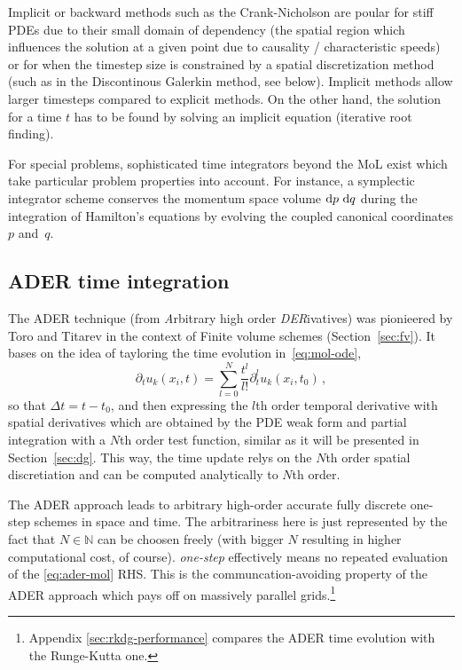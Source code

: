 Implicit or backward methods such as the Crank-Nicholson are poular for stiff
PDEs due to their small domain of dependency
(\ie the spatial region which influences the solution at a given point due
to causality / characteristic speeds) or for when the timestep size is
constrained by a spatial discretization method (such as in the Discontinous
Galerkin method, see below).
Implicit methods allow larger time\-steps compared to explicit methods. On
the other hand, the solution for a time $t$ has to be found by solving an
implicit equation (\eg iterative root finding).

For special problems, sophisticated time integrators beyond the MoL exist
which take particular problem properties into account. For instance, a
symplectic integrator scheme conserves the momentum space volume $\mathrm{d} p\ \mathrm{d} q$
during the integration of Hamilton's equations by evolving the coupled
canonical coordinates $p$ and~$q$.

\subsection{ADER time integration}
The ADER technique (from \emph{A}rbitrary high order \emph{DER}ivatives) was
pionieered by Toro and Titarev \cite{Titarev2002, Titarev2005, Toro2006}
in the context of Finite volume schemes (Section~\ref{sec:fv}). It
bases on the idea of tayloring the time evolution in~\eqref{eq:mol-ode},
\begin{equation}\label{eq:ader-mol}
\partial_t u_k(x_i, t) = \sum_{l=0}^N \frac{t^l}{l!}
  \partial_t^l u_k(x_i, t_0) \,,
\end{equation}
so that $\Delta t = t-t_0$, and then expressing the $l$th order temporal
derivative with spatial derivatives which are obtained by the PDE weak form
and partial integration with a $N$th order test function, similar as it
will be presented in Section~\ref{sec:dg}. This way, the time update relys on
the $N$th order spatial discretiation and can be computed analytically to $N$th
order.

The ADER approach leads to arbitrary high-order accurate fully discrete one-step
schemes in space and time. The arbitrariness here is just represented by the
fact that $N\in\mathbb N$ can be choosen freely (with bigger $N$ resulting
in higher computational cost, of course). \emph{one-step} effectively means
no repeated evaluation of the \eqref{eq:ader-mol} RHS. This is the
communcation-avoiding property of the ADER approach which pays off on massively
parallel grids.\footnote{
	Appendix \vref{sec:rkdg-performance} compares the ADER time evolution with
	the Runge-Kutta one.
	
}

